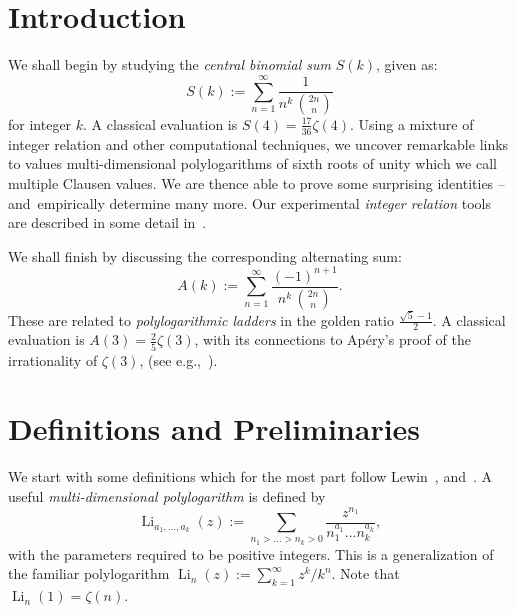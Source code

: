 \documentclass[a4paper,a4paper]{article}
\newcommand{\li}{\operatorname{Li}}
\begin{document}
\section{Introduction}

We shall begin by studying the {\em central binomial sum} $ S(k) $, given as:
\begin{equation}
\label{eq:bin}
S(k) := \sum_{n=1}^\infty \frac{1}{n^k \,{2n \choose n}}
\end{equation}
for integer $k$.
A classical evaluation is $S(4)=\frac{17}{36} \zeta(4)$.  Using a
mixture of integer relation and other computational techniques, we
uncover remarkable links to values multi-dimensional polylogarithms of
sixth roots of unity which we call multiple Clausen values.  We are thence
able to prove some surprising identities -- and\ empirically determine
many more. Our experimental {\em integer relation} tools are
described in some detail in~\cite{BL}.

 We shall finish by discussing the corresponding
alternating sum:
\begin{equation}
\label{eq:alt}
A(k):=\sum_{n=1}^\infty \frac{(-1)^{n+1}}
{n^k\,{{2n}\choose n}}.
\end{equation}
These are related to {\em polylogarithmic
ladders} in the {golden ratio} $\frac {\sqrt 5 -1}2$.  A classical
evaluation is $A(3)=\frac{2}{5} \zeta(3)$, with its connections to
Ap\'ery's proof of the irrationality of $\zeta(3)$, (see e.g.,~\cite{PA}).


\section{Definitions and Preliminaries}

We start with some definitions which for the most part follow Lewin~\cite{L},
and~\cite{BBB,BBBLC,BBBL}.
A useful {\em multi-dimensional polylogarithm} is defined by
$$ \li_{a_1, \dots , a_k} (z) :=
\sum_{n_1 > \dots > n_k > 0} \frac{z^{n_1}}{n_1^{a_1} \ldots n_k^{a_k}}, $$
with the parameters required to be positive integers.
  This is a generalization of the familiar polylogarithm
   $ \li_n(z) := \sum_{k=1}^\infty z^k/k^n $.
Note that $ \li_n(1) = \zeta(n) $.
\end{document}
